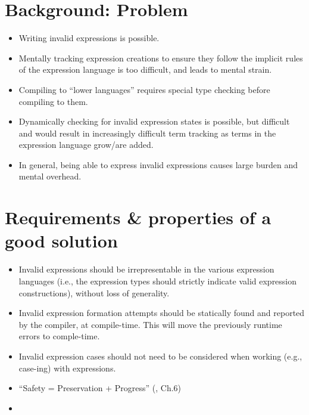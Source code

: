 \section{Background: Problem}

\begin{itemize}
    
    \item Writing invalid expressions is possible.
    
    \item Mentally tracking expression creations to ensure they follow the
          implicit rules of the expression language is too difficult, and leads
          to mental strain.

    \item Compiling to ``lower languages'' requires special type checking before
          compiling to them. 
    
    \item Dynamically checking for invalid expression states is possible, but
          difficult and would result in increasingly difficult term tracking as
          terms in the expression language grow/are added.

    \item In general, being able to express invalid expressions causes large
          burden and mental overhead.
    
\end{itemize}


\section{Requirements \& properties of a good solution}

\begin{itemize}
    
    \item Invalid expressions should be irrepresentable in the various expression
          languages (i.e., the expression types should strictly indicate valid
          expression constructions), without loss of generality.
    
    \item Invalid expression formation attempts should be statically found and
          reported by the compiler, at compile-time. This will move the
          previously runtime errors to comple-time.

    \item Invalid expression cases should not need to be considered when working
          (e.g., case-ing) with expressions.

    \item ``Safety = Preservation + Progress'' (\cite{harper2016pfpl}, Ch.6)
    
    \item {}

\end{itemize}

